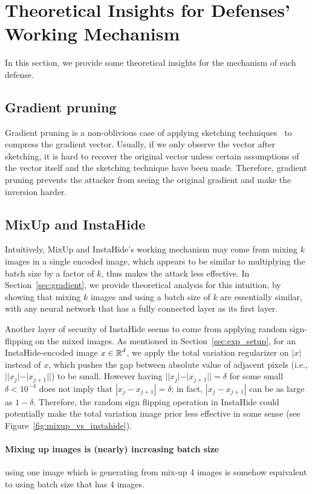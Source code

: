 \newpage

\section{Theoretical Insights for Defenses' Working Mechanism}
\label{sec:app_theory}
In this section, we provide some theoretical insights for the mechanism of each defense.

\subsection{Gradient pruning}
Gradient pruning is a non-oblivious case of applying sketching techniques~\citep{cls19} to compress the gradient vector. Usually, if we only observe the vector after sketching, it is hard to recover the original vector unless certain assumptions of the vector itself and the sketching technique have been made. Therefore, gradient pruning prevents the attacker from seeing the original gradient and make the inversion harder. 

\subsection{MixUp and InstaHide} Intuitively, MixUp and InstaHide's working mechanism may come from mixing $k$ images in a single encoded image, which appears to be similar to multiplying the batch size by a factor of $k$, thus makes the attack less effective. In Section~\ref{sec:gradient}, we provide theoretical analysis for this intuition, by showing that mixing $k$ images and using a batch size of $k$ are essentially similar, with any neural network that has a fully connected layer as its first layer. 

Another layer of security of InstaHide seems to come from applying random sign-flipping on the mixed images. As mentioned in Section~\ref{sec:exp_setup}, for an InstaHide-encoded image $x \in \operatorname{{\mathbb R}}^d$, we apply the total variation regularizer on $|x|$ instead of $x$, which pushes the gap between absolute value of adjacent pixels (i.e., $| |x_j| - |x_{j+1} | |$) to be small. However having $| |x_j| - |x_{j+1}|  | = \delta$ for some small $\delta < 10^{-4}$ does not imply that $|x_j - x_{j+1}| = \delta$; in fact, $|x_j - x_{j+1}|$ can be as large as $1-\delta$.  Therefore, the random sign flipping operation in InstaHide could potentially make the total variation image prior less effective in some sense (see Figure~\ref{fig:mixup_vs_instahide}). 

\iffalse
\paragraph{Mixing up images is (nearly) increasing batch size}
using one image which is generating from mix-up 4 images is somehow equivalent to using batch size that has 4 images.


